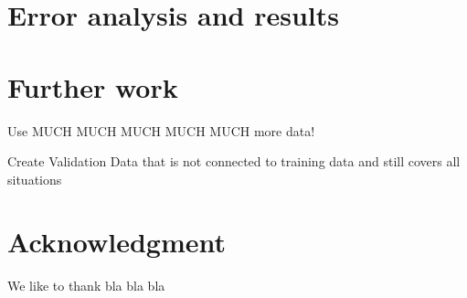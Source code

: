 \documentclass[conference]{IEEEtran}
\begin{document}
\section{Error analysis and results}

\section{Further work}

Use MUCH MUCH MUCH MUCH MUCH more data!

Create Validation Data that is not connected to training data and still covers all situations


\section*{Acknowledgment}
We like to thank bla bla bla




\printbibliography
\end{document}
